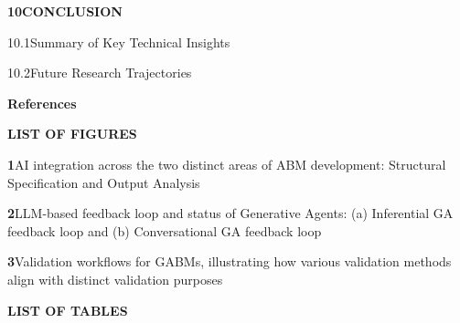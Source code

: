 \documentclass[12pt,a4paper]{report}
\begin{document}
\noindent\textbf{10\quad CONCLUSION}\dotfill\textbf{\pageref{chap:conclusion}}\par
\vspace{3pt}
\noindent\hspace{0.3in}10.1\quad Summary of Key Technical Insights\dotfill\pageref{sec:conclusion_summary}\par
\vspace{2pt}
\noindent\hspace{0.3in}10.2\quad Future Research Trajectories\dotfill\pageref{sec:conclusion_future}\par
\vspace{6pt}

\noindent\textbf{References}\dotfill\textbf{\pageref{chap:references}}\par

\clearpage


\clearpage
\thispagestyle{plain}
\begin{center}
{\fontsize{18}{22}\selectfont\bfseries LIST OF FIGURES}\par
\end{center}
\vspace{0.8cm}

\noindent\textbf{1}\quad AI integration across the two distinct areas of ABM development: Structural Specification and Output Analysis\dotfill\pageref{fig:fig1_ai_in_abm}\par
\vspace{8pt}
\noindent\textbf{2}\quad LLM-based feedback loop and status of Generative Agents: (a) Inferential GA feedback loop and (b) Conversational GA feedback loop\dotfill\pageref{fig:fig2_feedback_loop}\par
\vspace{8pt}
\noindent\textbf{3}\quad Validation workflows for GABMs, illustrating how various validation methods align with distinct validation purposes\dotfill\pageref{fig:fig3_validation_workflows}\par

\clearpage


\clearpage
\thispagestyle{plain}
\begin{center}
{\fontsize{18}{22}\selectfont\bfseries LIST OF TABLES}\par
\end{center}
\vspace{0.8cm}
\end{document}
